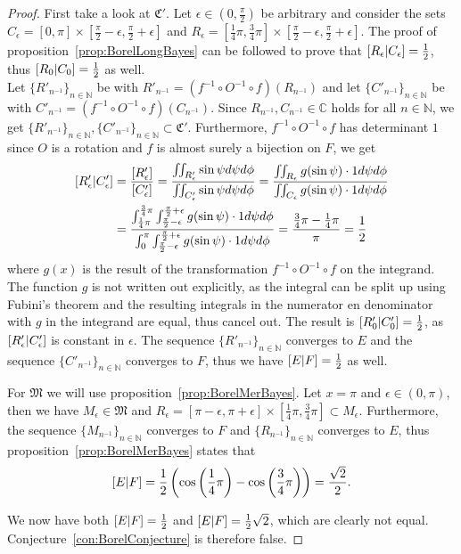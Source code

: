 \documentclass[twoside,a4paper]{report}
\theoremstyle{plain}
\theoremstyle{definition}
\theoremstyle{remark}
\numberwithin{equation}{chapter}
\newcommand{\N}{\mathbb{N}}
\renewcommand{\C}{\mathbb{C}}
\let\P\relax
\DeclareMathOperator{\P}{\mathbb{P}}
\DeclareMathOperator{\1}{\mathbbm{1}}
\begin{document}
\begin{proof}
First take a look at $\mathfrak{C}'$. Let $\epsilon\in\left(0,\frac{\pi}{2}\right)$ be arbitrary and consider the sets $C_\epsilon=[0,\pi]\times\left[\frac{\pi}{2}-\epsilon,\frac{\pi}{2}+\epsilon\right]$ and $R_\epsilon=\left[\frac{1}{4}\pi,\frac{3}{4}\pi\right]\times\left[\frac{\pi}{2}-\epsilon,\frac{\pi}{2}+\epsilon\right]$. The proof of proposition~\ref{prop:BorelLongBayes} can be followed to prove that $\P[R_\epsilon|C_\epsilon]=\frac{1}{2}$, thus $\P[R_0|C_0]=\frac{1}{2}$ as well.\\
Let $\{R'_{n^{-1}}\}_{n\in\N}$ be with $R'_{n^{-1}}=(f^{-1}\circ O^{-1}\circ f)(R_{n^{-1}})$ and let $\{C'_{n^{-1}}\}_{n\in\N}$ be with $C'_{n^{-1}}=(f^{-1}\circ O^{-1}\circ f)(C_{n^{-1}})$. Since $R_{n^{-1}},C_{n^{-1}}\in\mathfrak{\C}$ holds for all $n\in\N$, we get $\{R'_{n^{-1}}\}_{n\in\N},\{C'_{n^{-1}}\}_{n\in\N}\subset\mathfrak{C'}$. Furthermore, $f^{-1}\circ O^{-1}\circ f$ has determinant $1$ since $O$ is a rotation and $f$ is almost surely a bijection on $F$, we get
\begin{align}
\P[R'_\epsilon|C'_\epsilon]&=\frac{\P[R'_\epsilon]}{\P[C'_\epsilon]}=\frac{\iint_{R'_\epsilon}\sin\psi d\psi d\phi}{\iint_{C'_\epsilon} \sin\psi d\psi d\phi}=\frac{\iint_{R_\epsilon}g(\sin\psi)\cdot1 d\psi d\phi}{\iint_{C_\epsilon}g(\sin\psi)\cdot1d\psi d\phi}\\
&=\frac{\int_{\frac{1}{4}\pi}^{\frac{3}{4}\pi}\int_{\frac{\pi}{2}-\epsilon}^{\frac{\pi}{2}+\epsilon}g(\sin\psi)\cdot1 d\psi d\phi}{\int_{0}^{\pi}\int_{\frac{\pi}{2}-\epsilon}^{\frac{\pi}{2}+\epsilon}g(\sin\psi)\cdot1d\psi d\phi}=\frac{\frac{3}{4}\pi-\frac{1}{4}\pi}{\pi}=\frac{1}{2}
\end{align}
where $g(x)$ is the result of the transformation $f^{-1}\circ O^{-1}\circ f$ on the integrand. The function $g$ is not written out explicitly, as the integral can be split up using Fubini's theorem and the resulting integrals in the numerator en denominator with $g$ in the integrand are equal, thus cancel out. The result is $\P[R'_0|C'_0]=\frac{1}{2}$, as $\P[R'_\epsilon|C'_\epsilon]$ is constant in $\epsilon$. The sequence $\{R'_{n^{-1}}\}_{n\in\N}$ converges to $E$ and the sequence $\{C'_{n^{-1}}\}_{n\in\N}$ converges to $F$, thus we have $\P[E|F]=\frac{1}{2}$ as well.

For $\mathfrak{M}$ we will use proposition~\ref{prop:BorelMerBayes}. Let $x=\pi$ and $\epsilon\in(0,\pi)$, then we have $M_\epsilon\in\mathfrak{M}$ and $R_\epsilon=[\pi-\epsilon,\pi+\epsilon]\times\left[\frac{1}{4}\pi,\frac{3}{4}\pi\right]\subset M_\epsilon$. Furthermore, the sequence $\{M_{n^{-1}}\}_{n\in\N}$ converges to $F$ and $\{R_{n^{-1}}\}_{n\in\N}$ converges to $E$, thus proposition~\ref{prop:BorelMerBayes} states that
\begin{equation}
\P[E|F]=\frac{1}{2}\left(\cos\left(\frac{1}{4}\pi\right)-\cos\left(\frac{3}{4}\pi\right)\right)=\frac{\sqrt{2}}{2}.
\end{equation}

We now have both $\P[E|F]=\frac{1}{2}$ and $\P[E|F]=\frac{1}{2}\sqrt{2}$, which are clearly not equal. Conjecture~\ref{con:BorelConjecture} is therefore false.
\end{proof}
\end{document}
